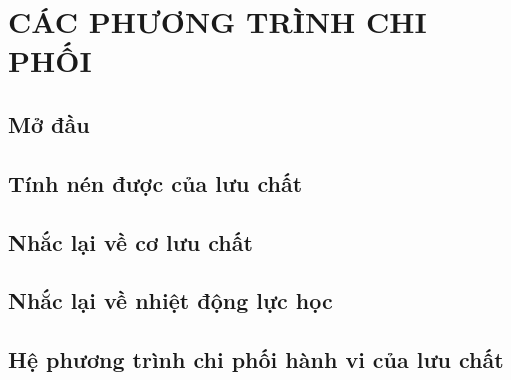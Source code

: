 \documentclass[../../main.tex]{subfiles}
\begin{document}
\dominitoc
\chapter{CÁC PHƯƠNG TRÌNH CHI PHỐI}
\minitoc
	\section{Mở đầu}
		
	\section{Tính nén được của lưu chất}
		
	\section{Nhắc lại về cơ lưu chất}
		
	\section{Nhắc lại về nhiệt động lực học}
		
	\section{Hệ phương trình chi phối hành vi của lưu chất}
		

\end{document}
